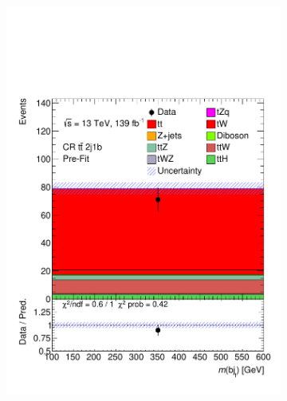 \begin{figure}[!h]
\begin{subfigure}[b]{0.33\linewidth}
    \includegraphics[width=\textwidth]{ubonn-thesis/Chapters/Chapters_07/Figure/Data/CR_2j1b.pdf} 
    \caption{}
  \end{subfigure} 
  \centering
  \begin{subfigure}[b]{0.33\linewidth}

\end{subfigure}
\end{figure}
